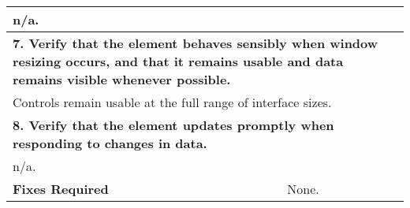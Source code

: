 \begin{longtable}{ l p{10cm} }
 \multicolumn{2}{p{14cm}}{n/a.}\\
 \hline
 \multicolumn{2}{p{14cm}}{\textbf{7. Verify that the element behaves sensibly when window resizing occurs, and that it remains usable and data remains visible whenever possible.}}\\
 \multicolumn{2}{p{14cm}}{Controls remain usable at the full range of interface sizes.}\\
 \hline
 \multicolumn{2}{p{14cm}}{\textbf{8. Verify that the element updates promptly when responding to changes in data.}}\\
 \multicolumn{2}{p{14cm}}{n/a.}\\
 \hline
 \textbf{Fixes Required} & None.\\
 \bottomrule
\end{longtable}
\clearpage


